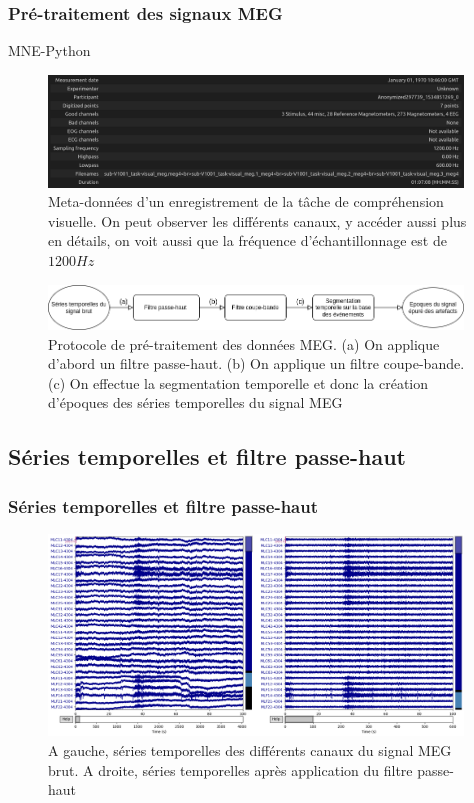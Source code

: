 \documentclass{beamer}
\begin{document}
\begin{frame}
\frametitle{Pré-traitement des signaux MEG}
MNE-Python 
\begin{figure}[!ht]
    \centering
    \includegraphics[width=11cm]{raw_info.png}
    \caption{Meta-données d'un enregistrement de la tâche de compréhension visuelle. On peut observer les différents canaux, y accéder aussi plus en détails, on voit aussi que la fréquence d'échantillonnage est de $1200 Hz$}
    \label{fig3.1}
\end{figure}
\end{frame}

\begin{frame}
\begin{figure}[!ht]
    \centering
    \includegraphics[width=11cm]{schema_pre_traitement.png}
    \caption{Protocole de pré-traitement des données MEG. (a) On applique d'abord un filtre passe-haut. (b) On applique un filtre coupe-bande. (c) On effectue la segmentation temporelle et donc la création d'époques des séries temporelles du signal MEG}
    \label{fig3.2}
\end{figure}
\end{frame}

\subsection{Séries temporelles et filtre passe-haut}

\begin{frame}
\frametitle{Séries temporelles et filtre passe-haut}
\begin{figure}[!ht]
    \centering
    \includegraphics[width=11cm]{series_temporelles_effet_hp.png}
    \caption{A gauche, séries temporelles des différents canaux du signal MEG brut. A droite, séries temporelles après application du filtre passe-haut}
    \label{fig3.3}
\end{figure} 
\end{frame}
\end{document}

